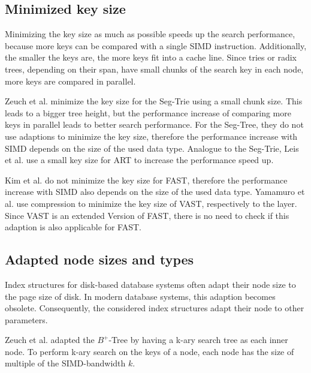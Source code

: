 \documentclass[runningheads,a4paper]{llncs}
\begin{document}
\subsection{Minimized key size}
Minimizing the key size as much as possible speeds up the search performance, because more keys can be compared with a single SIMD instruction. Additionally, the smaller the keys are, the more keys fit into a cache line. Since tries or radix trees, depending on their span, have small chunks of the search key in each node, more keys are compared in parallel.

Zeuch et al. minimize the key size for the Seg-Trie using a small chunk size. This leads to a bigger tree height, but the performance increase of comparing more keys in parallel leads to better search performance. For the Seg-Tree, they do not use adaptions to minimize the key size, therefore the performance increase with SIMD depends on the size of the used data type. Analogue to the Seg-Trie, Leis et al. use a small key size for ART to increase the performance speed up.

Kim et al. do not minimize the key size for FAST, therefore the performance increase with SIMD also depends on the size of the used data type. Yamamuro et al. use compression to minimize the key size of VAST, respectively to the layer. Since VAST is an extended Version of FAST, there is no need to check if this adaption is also applicable for FAST. 


\subsection{Adapted node sizes and types}
Index structures for disk-based database systems often adapt their node size to the page size of disk. In modern database systems, this adaption becomes obsolete. Consequently, the considered index structures adapt their node to other parameters. 

Zeuch et al. adapted the $B^+$-Tree by having a k-ary search tree as each inner node. To perform k-ary search on the keys of a node, each node has the size of multiple of the SIMD-bandwidth $k$.
\end{document}
